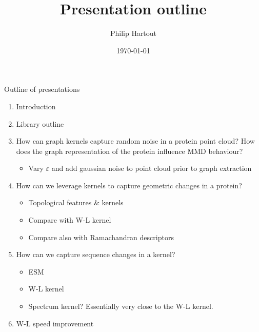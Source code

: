 \documentclass[aspectratio=169, 10pt, dvipsnames]{beamer}
\title{Presentation outline }
\date{\today}
\author{Philip Hartout}
\begin{document}
\maketitle

\begin{frame}[fragile]{Outline of presentations}
  \begin{enumerate}
    \item Introduction
    \item Library outline
    \item How can graph kernels capture random noise in a protein point cloud?
How does the graph representation of the protein influence MMD behaviour?
    \begin{itemize}
      \item Vary $\varepsilon$ and add gaussian noise to point cloud prior to
        graph extraction
    \end{itemize}
    \pause\item How can we leverage kernels to capture geometric changes in a protein?
    \begin{itemize}
    \item Topological features \& kernels
    \item Compare with W-L kernel
    \item Compare also with Ramachandran descriptors
    \end{itemize}
    \pause\item How can we capture sequence changes in a kernel?
    \begin{itemize}
    \item ESM
    \item W-L kernel
    \item Spectrum kernel? Essentially very close to the W-L kernel.
    \end{itemize}
    \pause\item W-L speed improvement
  \end{enumerate}
\end{frame}
\end{document}
